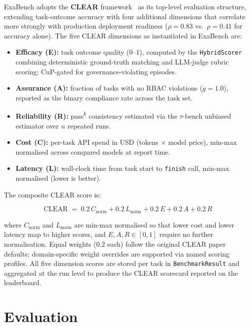 \documentclass[12pt]{article}
\begin{document}
ExaBench adopts the \textbf{CLEAR} framework~\citep{clear} as its top-level
evaluation structure, extending task-outcome accuracy with four additional
dimensions that correlate more strongly with production deployment readiness
($\rho = 0.83$ vs.\ $\rho = 0.41$ for accuracy alone).  The five CLEAR
dimensions as instantiated in ExaBench are:

\begin{itemize}
  \item \textbf{Efficacy (E):} task outcome quality (0--1), computed by the
    \texttt{HybridScorer} combining deterministic ground-truth matching and
    LLM-judge rubric scoring; CuP-gated for governance-violating episodes.
  \item \textbf{Assurance (A):} fraction of tasks with no RBAC violations
    ($g = 1.0$), reported as the binary compliance rate across the task set.
  \item \textbf{Reliability (R):} pass\textsuperscript{$k$} consistency
    estimated via the $\tau$-bench unbiased estimator over $n$ repeated runs.
  \item \textbf{Cost (C):} per-task API spend in USD (tokens $\times$ model
    price), min-max normalised across compared models at report time.
  \item \textbf{Latency (L):} wall-clock time from task start to
    \texttt{finish} call, min-max normalised (lower is better).
\end{itemize}

\noindent The composite CLEAR score is:

\begin{equation}
  \mathrm{CLEAR} \;=\; 0.2\,C_{\mathrm{norm}}
                     + 0.2\,L_{\mathrm{norm}}
                     + 0.2\,E
                     + 0.2\,A
                     + 0.2\,R
  \label{eq:clear}
\end{equation}

\noindent where $C_{\mathrm{norm}}$ and $L_{\mathrm{norm}}$ are min-max
normalised so that lower cost and lower latency map to higher scores, and
$E, A, R \in [0,1]$ require no further normalisation.  Equal weights (0.2
each) follow the original CLEAR paper defaults; domain-specific weight
overrides are supported via named scoring profiles.  All five dimension scores
are stored per task in \texttt{BenchmarkResult} and aggregated at the run
level to produce the CLEAR scorecard reported on the leaderboard.

\section{Evaluation}
\label{sec:evaluation}
\end{document}
